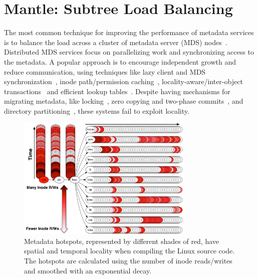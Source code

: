 \chapter{Mantle: Subtree Load Balancing}
\label{mantle}

The most common technique for improving the performance of metadata services is
to balance the load across a cluster of metadata server (MDS)
nodes~\cite{patil:fast2011-giga+, weil:osdi2006-ceph, weil:sc2004-dyn-metadata,
sinnamohideen:atc2010-ursa, xing:sc2009-skyfs}.  Distributed MDS services focus
on parallelizing work and synchronizing access to the metadata. A popular
approach is to encourage independent growth and reduce communication, using
techniques like lazy client and MDS synchronization~\cite{patil:fast2011-giga+,
ren:sc2014-indexfs, zheng:pdsw2014-batchfs, hildebrand:msst2005-pnfs,
zhu:pds2008-hba}, inode path/permission caching~\cite{brandt:mss2003-lh,
li:msst2006-dynamic, xing:sc2009-skyfs}, locality-aware/inter-object
transactions~\cite{sinnamohideen:atc2010-ursa,zhu:pds2008-hba,ren:atc2013-tablefs,
ren:sc2014-indexfs} and efficient lookup tables~\cite{brandt:mss2003-lh,
zhu:pds2008-hba}. Despite having mechanisms for migrating metadata, like
locking~\cite{sinnamohideen:atc2010-ursa,schmuck:fast2002-gpfs}, zero copying
and two-phase commits~\cite{sinnamohideen:atc2010-ursa}, and directory
partitioning~\cite{xing:sc2009-skyfs, patil:fast2011-giga+, ren:sc2014-indexfs,
weil:osdi2006-ceph}, these systems fail to exploit locality.

\begin{figure}[tb]
	\centering	
	\includegraphics[width=0.75\textwidth]{./chapters/mantle/figures/workload-tar.png}
	\caption{Metadata hotspots, represented by different shades of red, have spatial and temporal locality when compiling the Linux source code. The hotspots are calculated using the number of inode reads/writes and smoothed with an exponential decay. \label{figure:workload-tar}}
\end{figure}

